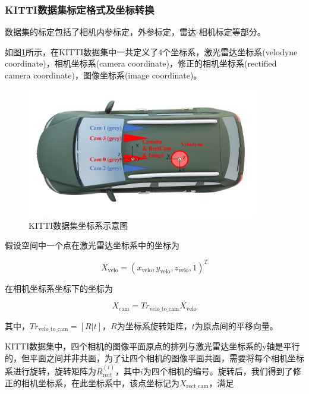 \subsubsection{KITTI数据集标定格式及坐标转换}

数据集的标定包括了相机内参标定，外参标定，雷达-相机标定等部分。

如图\ref{fig5}所示，在KITTI数据集中一共定义了4个坐标系，激光雷达坐标系(velodyne coordinate)，相机坐标系(camera coordinate)，修正的相机坐标系(rectified camera coordinate)，图像坐标系(image coordinate)。

\begin{figure}[htb] 
    \center
    \includegraphics[width=0.9\textwidth]{figure/fig5.png}
    \caption{KITTI数据集坐标系示意图}
    \label{fig5}
\end{figure}

假设空间中一个点在激光雷达坐标系中的坐标为

\begin{equation}
    X_{\text{velo}}=(x_{\text{velo}},y_{\text{velo}},z_{\text{velo}},1)^T
\end{equation}

在相机坐标系坐标下的坐标为

\begin{equation}
    X_{\text{cam}} = Tr_{\text{velo\_to\_cam}} X_{\text{velo}}
  \end{equation}
  
其中，$Tr_{\text{velo\_to\_cam}} = [R|t]$，$R$为坐标系旋转矩阵，$t$为原点间的平移向量。

KITTI数据集中，四个相机的图像平面原点的排列与激光雷达坐标系的y轴是平行的，但平面之间并非共面，为了让四个相机的图像平面共面，需要将每个相机坐标系进行旋转，旋转矩阵为$R_{\text{rect}}^{(i)}$，其中$i$为四个相机的编号。旋转后，我们得到了修正的相机坐标系，在此坐标系中，该点坐标记为$X_{\text{rect\_cam}}$，满足

